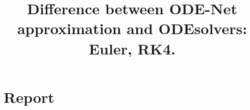 \documentclass[a4paper,14pt]{article}
\title{Difference between ODE-Net approximation and ODEsolvers: Euler, RK4.}
\date{}
\numberwithin{equation}{section}
\begin{document}
    \maketitle
    \tableofcontents
    
    \clearpage
    \section{Report} %
    {} %
    

    \clearpage
    \printbibliography
\end{document}

